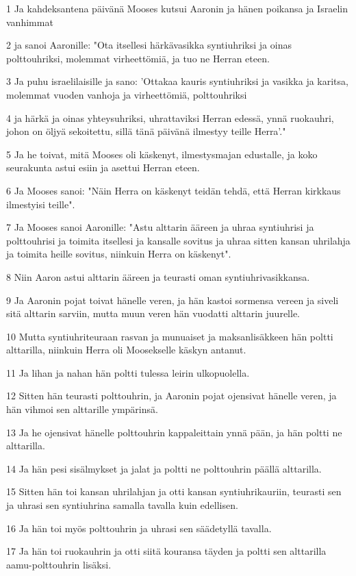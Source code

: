 \par 1 Ja kahdeksantena päivänä Mooses kutsui Aaronin ja hänen poikansa ja Israelin vanhimmat
\par 2 ja sanoi Aaronille: "Ota itsellesi härkävasikka syntiuhriksi ja oinas polttouhriksi, molemmat virheettömiä, ja tuo ne Herran eteen.
\par 3 Ja puhu israelilaisille ja sano: 'Ottakaa kauris syntiuhriksi ja vasikka ja karitsa, molemmat vuoden vanhoja ja virheettömiä, polttouhriksi
\par 4 ja härkä ja oinas yhteysuhriksi, uhrattaviksi Herran edessä, ynnä ruokauhri, johon on öljyä sekoitettu, sillä tänä päivänä ilmestyy teille Herra'."
\par 5 Ja he toivat, mitä Mooses oli käskenyt, ilmestysmajan edustalle, ja koko seurakunta astui esiin ja asettui Herran eteen.
\par 6 Ja Mooses sanoi: "Näin Herra on käskenyt teidän tehdä, että Herran kirkkaus ilmestyisi teille".
\par 7 Ja Mooses sanoi Aaronille: "Astu alttarin ääreen ja uhraa syntiuhrisi ja polttouhrisi ja toimita itsellesi ja kansalle sovitus ja uhraa sitten kansan uhrilahja ja toimita heille sovitus, niinkuin Herra on käskenyt".
\par 8 Niin Aaron astui alttarin ääreen ja teurasti oman syntiuhrivasikkansa.
\par 9 Ja Aaronin pojat toivat hänelle veren, ja hän kastoi sormensa vereen ja siveli sitä alttarin sarviin, mutta muun veren hän vuodatti alttarin juurelle.
\par 10 Mutta syntiuhriteuraan rasvan ja munuaiset ja maksanlisäkkeen hän poltti alttarilla, niinkuin Herra oli Moosekselle käskyn antanut.
\par 11 Ja lihan ja nahan hän poltti tulessa leirin ulkopuolella.
\par 12 Sitten hän teurasti polttouhrin, ja Aaronin pojat ojensivat hänelle veren, ja hän vihmoi sen alttarille ympärinsä.
\par 13 Ja he ojensivat hänelle polttouhrin kappaleittain ynnä pään, ja hän poltti ne alttarilla.
\par 14 Ja hän pesi sisälmykset ja jalat ja poltti ne polttouhrin päällä alttarilla.
\par 15 Sitten hän toi kansan uhrilahjan ja otti kansan syntiuhrikauriin, teurasti sen ja uhrasi sen syntiuhrina samalla tavalla kuin edellisen.
\par 16 Ja hän toi myös polttouhrin ja uhrasi sen säädetyllä tavalla.
\par 17 Ja hän toi ruokauhrin ja otti siitä kouransa täyden ja poltti sen alttarilla aamu-polttouhrin lisäksi.
